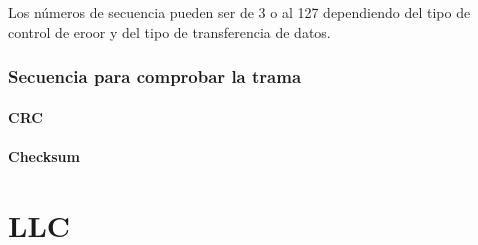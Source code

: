\documentclass[12pt, fleqn]{report}                             %
\theoremstyle{break}                                            %
\begin{document}
            Los números de secuencia pueden ser de 3 o al 127 dependiendo del tipo de control de eroor y del tipo de transferencia de datos.
                    \begin{figure}[ht]
                \centering
            \end{figure}

            \subsection{Secuencia para comprobar la trama}
            \subsubsection{CRC}
            \subsubsection{Checksum}


            \chapter{LLC}

            

 


\end{document}
